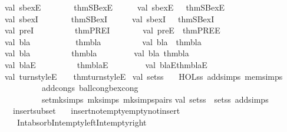 \begin{isabellebody}
\isanewline
val\ sbexE{}\ \ \ \ \ \ \ {\isacharequal}\ thm{\isachardoublequote}SBex{\isacharunderscore}E{}{\isachardoublequote}\ \ \ \ \ \ val\ sbexE{}\ \ \ {\isacharequal}thm{\isachardoublequote}SBex{\isacharunderscore}E{}{\isachardoublequote}\ \isanewline
val\ sbexI{}\ \ \ \ \ \ \ {\isacharequal}\ thm{\isachardoublequote}SBex{\isacharunderscore}I{}{\isachardoublequote}\ \ \ \ \ \ val\ sbexI{}\ \ \ {\isacharequal}thm{\isachardoublequote}SBex{\isacharunderscore}I{}{\isachardoublequote}\isanewline
val\ preI\ \ \ \ \ \ \ \ \ {\isacharequal}\ thm{\isachardoublequote}PRE{\isacharunderscore}I{\isachardoublequote}\ \ \ \ \ \ \ \ val\ preE\ {\isacharequal}\ thm{\isachardoublequote}PRE{\isacharunderscore}E{\isachardoublequote}\ \isanewline
val\ bla\ \ \ \ \ \ \ \ \ \ {\isacharequal}\ thm{\isachardoublequote}bla{\isachardoublequote}\ \ \ \ \ \ \ \ \ \ val\ bla{}\ {\isacharequal}\ thm{\isachardoublequote}bla{}{\isachardoublequote}\isanewline
val\ bla{\isacharprime}\ \ \ \ \ \ \ \ \ {\isacharequal}\ thm{\isachardoublequote}bla{\isacharprime}{\isachardoublequote}\ \ \ \ \ \ \ \ \ val\ bla{}{\isacharprime}{\isacharequal}\ thm{\isachardoublequote}bla{}{\isacharprime}{\isachardoublequote}\isanewline
val\ blaE\ \ \ \ \ \ \ \ \ {\isacharequal}\ thm{\isachardoublequote}blaE{\isachardoublequote}\ \ \ \ \ \ \ \ \ val\ bla{}E{\isacharequal}thm{\isachardoublequote}bla{}E{\isachardoublequote}\isanewline
val\ turnstyleE\ \ \ {\isacharequal}\ thm{\isachardoublequote}turnstyle{\isacharunderscore}E{\isachardoublequote}\ \isanewline
\isanewline
val\ set{\isacharunderscore}ss\ {\isacharequal}\isanewline
\ \ HOL{\isacharunderscore}ss\ addsimps\ mem{\isacharunderscore}simps\isanewline
\ \ \ \ \ \ \ \ \ addcongs\ {\isacharbrackleft}ball{\isacharunderscore}cong{\isacharcomma}bex{\isacharunderscore}cong{\isacharbrackright}\isanewline
\ \ \ \ \ \ \ \ \ setmksimps\ {\isacharparenleft}mksimps\ mksimps{\isacharunderscore}pairs{\isacharparenright}{\isacharsemicolon}\isanewline
\isanewline
val\ set{\isacharunderscore}ss\ {\isacharequal}\ set{\isacharunderscore}ss\ addsimps\isanewline
\ \ {\isacharbrackleft}insert{\isacharunderscore}subset{\isacharcomma}\isanewline
\ \ \ insert{\isacharunderscore}not{\isacharunderscore}empty{\isacharcomma}empty{\isacharunderscore}not{\isacharunderscore}insert{\isacharcomma}\isanewline
\ \ \ Int{\isacharunderscore}absorb{\isacharcomma}Int{\isacharunderscore}empty{\isacharunderscore}left{\isacharcomma}Int{\isacharunderscore}empty{\isacharunderscore}right{\isacharcomma}\isanewline

\end{isabellebody}
